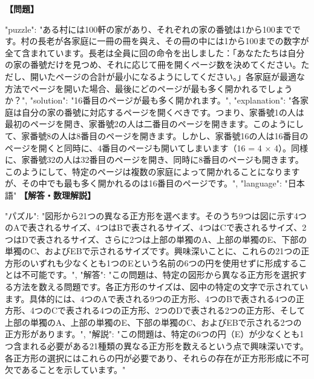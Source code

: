 \documentclass[10pt,a4paper,oneside,openany]{ltjsbook}
\begin{document}
\begin{tcolorbox}[colback=softblue,colframe=primaryblue,title=\textbf{第 284 問：THE CROSS TARGET.},arc=2mm,boxrule=1pt,breakable]
\textbf{【問題】}\par\vspace{0.3em}
{
  "puzzle": "ある村には100軒の家があり、それぞれの家の番號は1から100までです。村の長老が各家庭に一冊の冊を與え、その冊の中には1から100までの数字が全て含まれています。長老は全員に回の命令を出しました：「あなたたちは自分の家の番號だけを見つめ、それに応じて冊を開くページ数を決めてください。ただし、開いたページの合計が最小になるようにしてください。」各家庭が最適な方法でページを開いた場合、最後にどのページが最も多く開かれるでしょうか？",
  "solution": "16番目のページが最も多く開かれます。",
  "explanation": "各家庭は自分の家の番號に対応するページを開くべきです。つまり、家番號1の人は最初のページを開き、家番號2の人は二番目のページを開きます。このようにして、家番號8の人は8番目のページを開きます。しかし、家番號16の人は16番目のページを開くと同時に、4番目のページも開いてしまいます（16 = 4 × 4）。同様に、家番號32の人は32番目のページを開き、同時に8番目のページも開きます。このようにして、特定のページは複数の家庭によって開かれることになりますが、その中でも最も多く開かれるのは16番目のページです。",
  "language": "日本語"
}
\tcblower
\textbf{【解答・数理解説】}\par\vspace{0.3em}
{
  "パズル": "図形から21つの異なる正方形を選べます。そのうち9つは図に示す4つのAで表されるサイズ、4つはBで表されるサイズ、4つはCで表されるサイズ、2つはDで表されるサイズ、さらに2つは上部の単獨のA、上部の単獨のE、下部の単獨のC、およびEBで示されるサイズです。興味深いことに、これらの21つの正方形のいずれも少なくとも1つのEという名前の6つの円を使用せずに形成することは不可能です。",
  "解答": "この問題は、特定の図形から異なる正方形を選択する方法を数える問題です。各正方形のサイズは、図中の特定の文字で示されています。具体的には、4つのAで表される9つの正方形、4つのBで表される4つの正方形、4つのCで表される4つの正方形、2つのDで表される2つの正方形、そして上部の単獨のA、上部の単獨のE、下部の単獨のC、およびEBで示される2つの正方形があります。",
  "解説": "この問題は、特定の6つの円（E）が少なくとも1つ含まれる必要がある21種類の異なる正方形を数えるという点で興味深いです。各正方形の選択にはこれらの円が必要であり、それらの存在が正方形形成に不可欠であることを示しています。"
}
\end{tcolorbox}
\end{document}
